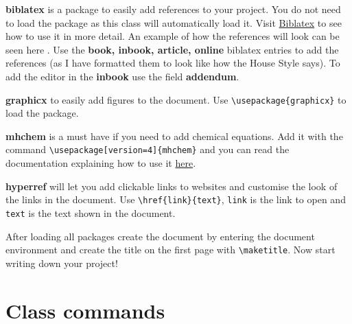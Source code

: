 \documentclass[headers1]{MSEHouseStyle}
\begin{document}
\begin{numlist}
\item \textbf{biblatex} is a package to easily add references to your project. You do not need to load the package as this class will automatically load it. Visit \href{https://www.overleaf.com/learn/latex/Biblatex_citation_styles}{Biblatex} to see how to use it in more detail. An example of how the references will look can be seen here \cite{einstein,knuthwebsite,dirac,knuth-fa}. Use the \textbf{book, inbook, article, online} biblatex entries to add the references (as I have formatted them to look like how the House Style says). To add the editor in the \textbf{inbook} use the field \textbf{addendum}.
\item \textbf{graphicx} to easily add figures to the document. Use \verb|\usepackage{graphicx}| to load the package.
\item \textbf{mhchem} is a must have if you need to add chemical equations. Add it with the command \verb|\usepackage[version=4]{mhchem}| and you can read the documentation explaining how to use it \href{https://ctan.org/pkg/mhchem}{here}.
\item \textbf{hyperref} will let you add clickable links to websites and customise the look of the links in the document. Use \verb|\href{link}{text}|, \verb|link| is the link to open and \verb|text| is the text shown in the document.
\end{numlist}

After loading all packages create the document by entering the document environment and create the title on the first page with \verb|\maketitle|. Now start writing down your project!

\section{Class commands}
\end{document}
